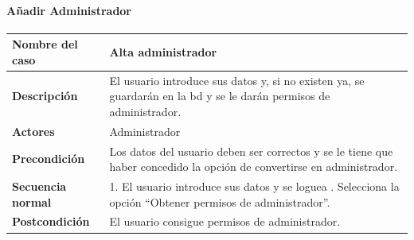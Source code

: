 \paragraph{Añadir Administrador}
\begin{table}[H]
	\centering
	\small
	\begin{tabularx}{0.8\textwidth}{|p{3.5cm}|X|}
		\hline
		\rowcolor{lightgray}
		\textbf{Nombre del caso}  & \textbf{Alta administrador}                                                                                                                                                                                                                                                                                                                         \\
		\hline
		\textbf{Descripción}      & El usuario introduce sus datos y, si no existen ya, se guardarán en la \gls{bd} y se le darán permisos de administrador.                                                                                                                                                                                                                            \\
		\hline
		\textbf{Actores}          & Administrador                                                                                                                                                                                                                                                                                                                                       \\
		\hline
		\textbf{Precondición}     & Los datos del usuario deben ser correctos y se le tiene que haber concedido la opción de convertirse en administrador.                                                                                                                                                                                                                              \\
		\hline
		\textbf{Secuencia normal} & 1. El usuario introduce sus datos y se loguea \newline 2. Selecciona la opción ``Obtener permisos de administrador''.                                                                                                                                                                                                                               \\
		\hline
		\textbf{Postcondición}    & El usuario consigue permisos de administrador.                                                                                                                                                                                                                                                                                                      \\

\end{tabularx}
\end{table}
